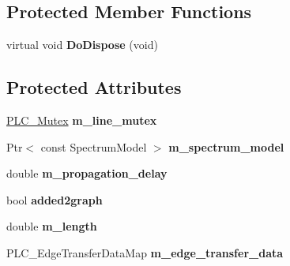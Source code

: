 \subsection*{\-Protected \-Member \-Functions}
\begin{DoxyCompactItemize}
\item 
\hypertarget{classns3_1_1PLC__Edge_a4703458299a5f874da08232fdf9d6b92}{virtual void {\bfseries \-Do\-Dispose} (void)}\label{classns3_1_1PLC__Edge_a4703458299a5f874da08232fdf9d6b92}

\end{DoxyCompactItemize}
\subsection*{\-Protected \-Attributes}
\begin{DoxyCompactItemize}
\item 
\hypertarget{classns3_1_1PLC__Edge_ada00bd0fb6e1dbb9148f645b859d6a6a}{\hyperlink{structns3_1_1PLC__Mutex}{\-P\-L\-C\-\_\-\-Mutex} {\bfseries m\-\_\-line\-\_\-mutex}}\label{classns3_1_1PLC__Edge_ada00bd0fb6e1dbb9148f645b859d6a6a}

\item 
\hypertarget{classns3_1_1PLC__Edge_ae0fe84523339bbade8bcb905c8a9bceb}{\-Ptr$<$ const \-Spectrum\-Model $>$ {\bfseries m\-\_\-spectrum\-\_\-model}}\label{classns3_1_1PLC__Edge_ae0fe84523339bbade8bcb905c8a9bceb}

\item 
\hypertarget{classns3_1_1PLC__Edge_ab90645f1de623ae1c81aadede03f4138}{double {\bfseries m\-\_\-propagation\-\_\-delay}}\label{classns3_1_1PLC__Edge_ab90645f1de623ae1c81aadede03f4138}

\item 
\hypertarget{classns3_1_1PLC__Edge_a11d16bf051e9e6970734cd8c8dc2fbd5}{bool {\bfseries added2graph}}\label{classns3_1_1PLC__Edge_a11d16bf051e9e6970734cd8c8dc2fbd5}

\item 
\hypertarget{classns3_1_1PLC__Edge_aae665bf4f0a1d8975a060bb0564c716f}{double {\bfseries m\-\_\-length}}\label{classns3_1_1PLC__Edge_aae665bf4f0a1d8975a060bb0564c716f}

\item 
\hypertarget{classns3_1_1PLC__Edge_a8a1fa48343af7822ac4775b7768e317a}{\-P\-L\-C\-\_\-\-Edge\-Transfer\-Data\-Map {\bfseries m\-\_\-edge\-\_\-transfer\-\_\-data}}\label{classns3_1_1PLC__Edge_a8a1fa48343af7822ac4775b7768e317a}

\end{DoxyCompactItemize}
